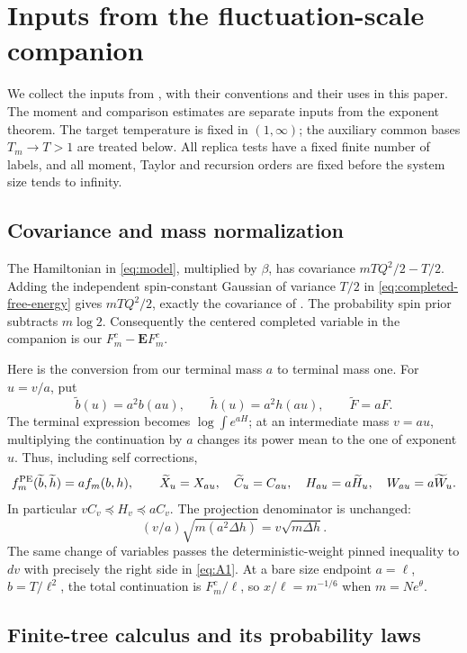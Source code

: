 \section{Inputs from the fluctuation-scale companion}
\label{sec:companion-interface}

We collect the inputs from \cite{PE}, with their conventions and their
uses in this paper. The moment and comparison estimates are separate inputs
from the exponent theorem. The target temperature is fixed in $(1,\infty)$; the auxiliary common
bases $T_m\to T>1$ are treated below. All replica tests have a fixed finite number of labels, and all moment,
Taylor and recursion orders are fixed before the system size tends to infinity.

\subsection{Covariance and mass normalization}

The Hamiltonian in \eqref{eq:model}, multiplied by $\beta$, has covariance
$mTQ^2/2-T/2$. Adding the independent spin-constant Gaussian of variance
$T/2$ in \eqref{eq:completed-free-energy} gives $mTQ^2/2$, exactly the
covariance of \cite{PE}. The probability spin prior subtracts $m\log2$.
Consequently the centered completed variable in the companion is our
$F_m^c-\mathbf E F_m^c$.

Here is the conversion from our terminal mass $a$ to terminal mass one.
For $u=v/a$, put
\[
 \widetilde b(u)=a^2b(au),\qquad
 \widetilde h(u)=a^2h(au),\qquad
 \widetilde F=aF.
\]
The terminal expression becomes $\log\int e^{aH}$; at an intermediate
mass $v=au$, multiplying the continuation by $a$ changes its power mean
to the one of exponent $u$. Thus, including self corrections,
\[
 f_m^{\rm PE}(\widetilde b,\widetilde h)=a f_m(b,h),\qquad
 \widetilde X_u=X_{au},\quad \widetilde C_u=C_{au},\quad
 H_{au}=a\widetilde H_u,\quad W_{au}=a\widetilde W_u.
\]
In particular $vC_v\preceq H_v\preceq aC_v$. The projection denominator
is unchanged:
\[
 (v/a)\sqrt{m(a^2\Delta h)}=v\sqrt{m\Delta h}.
\]
The same change of variables passes the deterministic-weight pinned
inequality to $dv$ with precisely the right side in \eqref{eq:A1}.
At a bare size endpoint $a=\ell$, $b=T/\ell^2$, the total continuation
is $F_m^c/\ell$, so $x/\ell=m^{-1/6}$ when $m=N e^\theta$.

\subsection{Finite-tree calculus and its probability laws}

